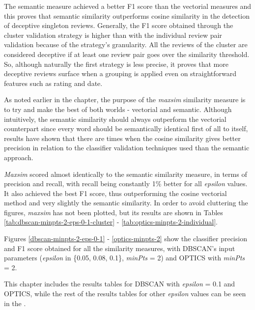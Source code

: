 The semantic measure achieved a better F1 score than the vectorial measures and this proves that semantic similarity outperforms cosine similarity in the detection of deceptive singleton reviews. 
Generally, the F1 score obtained through the cluster validation strategy is higher than with the individual review pair validation because of the strategy's granularity. All the reviews of the cluster are considered deceptive if at least one review pair goes over the similarity threshold. So, although naturally the first strategy is less precise, it proves that more deceptive reviews surface when a grouping is applied even on straightforward features such as rating and date. 

As noted earlier in the  chapter, the purpose of the \textit{maxsim} similarity measure is to try and make the best of both worlds - vectorial and semantic. Although intuitively, the semantic similarity should always outperform the vectorial counterpart since every word should be semantically identical first of all to itself, results have shown that there are times when the cosine similarity gives better precision in relation to the classifier validation techniques used than the semantic approach. 

\textit{Maxsim} scored almost identically to the semantic similarity measure, in terms of precision and recall, with recall being constantly 1\% better for all \textit{epsilon} values. It also achieved the best F1 score, thus outperforming the cosine vectorial method and very slightly the semantic similarity. In order to avoid cluttering the figures, \textit{maxsim} has not been plotted, but its results are shown in Tables \ref{tab:dbscan-minpts-2-eps-0-1-cluster} - \ref{tab:optics-minpts-2-individual}.

Figures \ref{dbscan-minpts-2-eps-0-1} - \ref{optics-minpts-2} show the classifier precision and F1 score obtained for all the similarity measures, with DBSCAN's input parameters (\textit{epsilon} in \{0.05, 0.08, 0.1\}, \textit{minPts} = 2) and OPTICS with \textit{minPts} = 2.

This chapter includes the results tables for DBSCAN with \textit{epsilon} = 0.1 and OPTICS, while the rest of the results tables for other \textit{epsilon} values can be seen in the .

